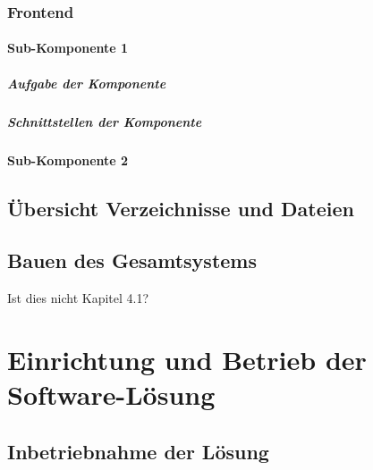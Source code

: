 \documentclass[a4paper,11pt,DIV=12,overfullrule=on]{scrreprt}%
\begin{document}
\subsection{Frontend}
\subsubsection{Sub-Komponente 1}
\paragraph{Aufgabe der Komponente}
\paragraph{Schnittstellen der Komponente}
\subsubsection{Sub-Komponente 2}
\section{Übersicht Verzeichnisse und Dateien}
\section{Bauen des Gesamtsystems}
Ist dies nicht Kapitel 4.1?


\chapter{Einrichtung und Betrieb der Software-Lösung}
\section{Inbetriebnahme der Lösung}
\end{document}
